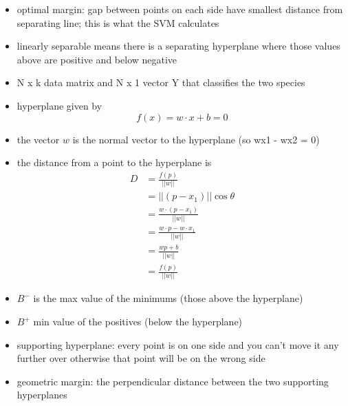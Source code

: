 \documentclass{article}
\begin{document}
\begin{itemize}
    \item optimal margin: gap between points on each side have smallest distance from separating line; this is what the SVM calculates
    \item linearly separable means there is a separating hyperplane where those values above are positive and below negative
    \item N x k data matrix and N x 1 vector Y that classifies the two species
    \item hyperplane given by \[ f(x)=w \cdot x +b = 0 \]
    \item the vector $w$ is the normal vector to the hyperplane (so wx1 - wx2 = 0)
    \item the distance from a point to the hyperplane is \begin{align*}
        D &= \frac{f(p)}{||w||} \\
        &= ||(p-x_1)||\cos{\theta} \\
        &= \frac{w \cdot (p-x_1)}{||w||}\\
        &=\frac{w \cdot p - w \cdot x_1}{||w||} \\
        &= \frac{wp + b}{||w||} \\
        &= \frac{f(p)}{||w||}
    \end{align*}
    \item $B^-$ is the max value of the minimums (those above the hyperplane)
    \item $B^+$ min value of the positives (below the hyperplane)
    \item supporting hyperplane: every point is on one side and you can't move it any further over otherwise that point will be on the wrong side
    \item geometric margin: the perpendicular distance between the two supporting hyperplanes
\end{itemize}
\end{document}
